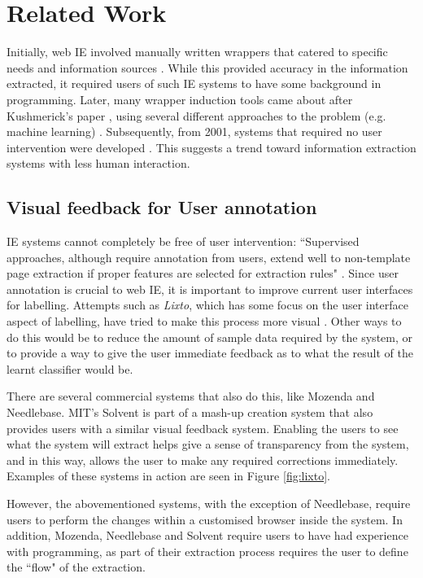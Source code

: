 \chapter{Related Work}
\label{chap:relatedwork}
Initially, web IE involved manually written wrappers that catered to specific needs and
information sources \cite{Chawathe1994,Perkowitz1995}. While this provided accuracy in the
information extracted, it required users of such IE systems to have some background in
programming. Later, many wrapper induction tools came about after Kushmerick's paper
\cite{Kushmerick1997}, using several different approaches to the problem (e.g. machine
learning) \cite{Freitag1998,Soderland}. Subsequently, from 2001, systems that required no user
intervention were developed \cite{Chang2001,Crescenzi2002,Arasu2003}. This suggests a trend
toward information extraction systems with less human interaction.
\section{Visual feedback for User annotation}
IE systems cannot completely be free of user intervention: ``Supervised approaches,
although require annotation from users, extend well to non-template page extraction if proper
features are selected for extraction rules" \cite{Kayed2006}. Since user annotation is crucial
to web IE, it is important to improve current user interfaces for labelling. Attempts such as
\textit{Lixto}, which has some focus on the user interface aspect of labelling, have tried to
make this process more visual \cite{Baumgartner2001}. Other ways to do this would be to reduce
the amount of sample data required by the system, or to provide a way to give the user
immediate feedback as to what the result of the learnt classifier would be.

There are several commercial systems that also do this, like Mozenda and Needlebase. %
MIT's Solvent is part of a mash-up creation system that also provides users with a similar
visual feedback system. Enabling the users to see what the system will extract helps give a
sense of transparency from the system, and in this way, allows the user to make any required
corrections immediately. Examples of these systems in action are seen in Figure \ref{fig:lixto}.

However, the abovementioned systems, with the exception of Needlebase, require users to perform
the changes within a customised browser inside the system. In addition, Mozenda, Needlebase and
Solvent require users to have had experience with programming, as part of their extraction
process requires the user to define the ``flow" of the extraction.

